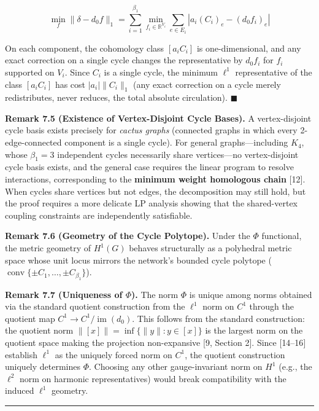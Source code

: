 \documentclass[
]{article}
\begin{document}
\[\min_f \|\delta - d_0 f\|_1 = \sum_{i=1}^{\beta_1} \min_{f_i \in \mathbb{R}^{V_i}} \sum_{e \in E_i} |a_i (C_i)_e - (d_0 f_i)_e|\]

On each component, the cohomology class \([a_i C_i]\) is
one-dimensional, and any exact correction on a single cycle changes the
representative by \(d_0 f_i\) for \(f_i\) supported on \(V_i\). Since
\(C_i\) is a single cycle, the minimum \(\ell^1\) representative of the
class \([a_i C_i]\) has cost \(|a_i| \|C_i\|_1\) (any exact correction
on a cycle merely redistributes, never reduces, the total absolute
circulation). \(\blacksquare\)

\textbf{Remark 7.5 (Existence of Vertex-Disjoint Cycle Bases).} A
vertex-disjoint cycle basis exists precisely for \emph{cactus graphs}
(connected graphs in which every 2-edge-connected component is a single
cycle). For general graphs---including \(K_4\), whose \(\beta_1 = 3\)
independent cycles necessarily share vertices---no vertex-disjoint cycle
basis exists, and the general case requires the linear program to
resolve interactions, corresponding to the \textbf{minimum weight
homologous chain} {[}12{]}. When cycles share vertices but not edges,
the decomposition may still hold, but the proof requires a more delicate
LP analysis showing that the shared-vertex coupling constraints are
independently satisfiable.

\textbf{Remark 7.6 (Geometry of the Cycle Polytope).} Under the \(\Phi\)
functional, the metric geometry of \(H^1(G)\) behaves structurally as a
polyhedral metric space whose unit locus mirrors the network's bounded
cycle polytope
(\(\operatorname{conv}\{\pm C_1, \ldots, \pm C_{\beta_1}\}\)).

\textbf{Remark 7.7 (Uniqueness of \(\Phi\)).} The norm \(\Phi\) is
unique among norms obtained via the standard quotient construction from
the \(\ell^1\) norm on \(C^1\) through the quotient map
\(C^1 \to C^1/\operatorname{im}(d_0)\). This follows from the standard
construction: the quotient norm \(\|[x]\| = \inf\{\|y\| : y \in [x]\}\)
is the largest norm on the quotient space making the projection
non-expansive {[}9, Section 2{]}. Since {[}14--16{]} establish
\(\ell^1\) as the uniquely forced norm on \(C^1\), the quotient
construction uniquely determines \(\Phi\). Choosing any other
gauge-invariant norm on \(H^1\) (e.g., the \(\ell^2\) norm on harmonic
representatives) would break compatibility with the induced \(\ell^1\)
geometry.

\begin{center}\rule{0.5\linewidth}{0.5pt}\end{center}
\end{document}
